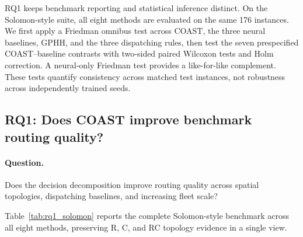 \documentclass[letterpaper]{article}
\begin{document}
RQ1 keeps benchmark reporting and statistical inference distinct. On the Solomon-style suite, all eight methods are evaluated on the same 176 instances. We first apply a Friedman omnibus test across COAST, the three neural baselines, GPHH, and the three dispatching rules, then test the seven prespecified COAST--baseline contrasts with two-sided paired Wilcoxon tests and Holm correction. A neural-only Friedman test provides a like-for-like complement. These tests quantify consistency across matched test instances, not robustness across independently trained seeds.

\subsection{RQ1: Does COAST improve benchmark routing quality?}

\paragraph{Question.} Does the decision decomposition improve routing quality across spatial topologies, dispatching baselines, and increasing fleet scale?

Table~\ref{tab:rq1_solomon} reports the complete Solomon-style benchmark across all eight methods, preserving R, C, and RC topology evidence in a single view.
\end{document}
